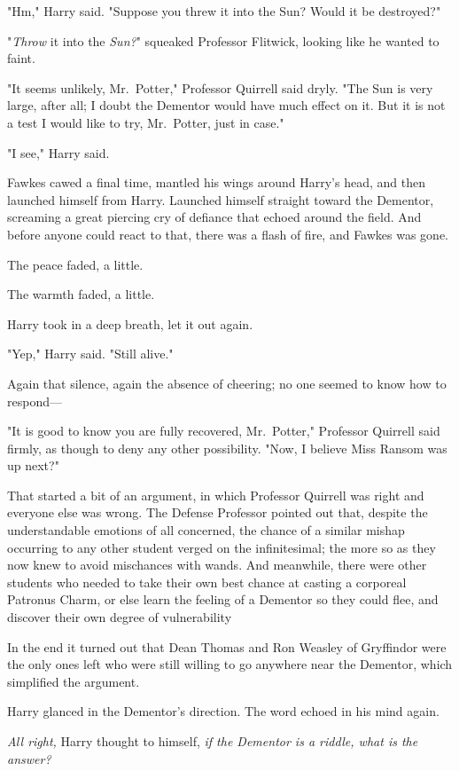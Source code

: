 "Hm," Harry said. "Suppose you threw it into the Sun? Would it be destroyed?"

"\emph{Throw} it into the \emph{Sun?}" squeaked Professor Flitwick, looking
like he wanted to faint.

"It seems unlikely, Mr.~Potter," Professor Quirrell said dryly. "The Sun is
very large, after all; I doubt the Dementor would have much effect on it. But
it is not a test I would like to try, Mr.~Potter, just in case."

"I see," Harry said.

Fawkes cawed a final time, mantled his wings around Harry's head, and then
launched himself from Harry. Launched himself straight toward the Dementor,
screaming a great piercing cry of defiance that echoed around the field. And
before anyone could react to that, there was a flash of fire, and Fawkes was
gone.

The peace faded, a little.

The warmth faded, a little.

Harry took in a deep breath, let it out again.

"Yep," Harry said. "Still alive."

Again that silence, again the absence of cheering; no one seemed to know how to
respond—

"It is good to know you are fully recovered, Mr.~Potter," Professor Quirrell
said firmly, as though to deny any other possibility. "Now, I believe Miss
Ransom was up next?"

That started a bit of an argument, in which Professor Quirrell was right and
everyone else was wrong. The Defense Professor pointed out that, despite the
understandable emotions of all concerned, the chance of a similar mishap
occurring to any other student verged on the infinitesimal; the more so as they
now knew to avoid mischances with wands. And meanwhile, there were other
students who needed to take their own best chance at casting a corporeal
Patronus Charm, or else learn the feeling of a Dementor so they could flee, and
discover their own degree of vulnerability{\el}

In the end it turned out that Dean Thomas and Ron Weasley of Gryffindor were
the only ones left who were still willing to go anywhere near the Dementor,
which simplified the argument.

Harry glanced in the Dementor's direction. The word echoed in his mind again.

\emph{All right,} Harry thought to himself, \emph{if the Dementor is a riddle,
what is the answer?}

